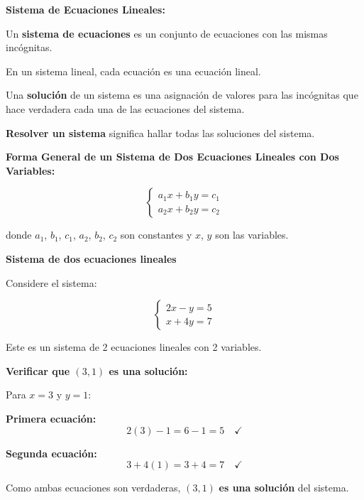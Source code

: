 


\begin{definition}
\textbf{Sistema de Ecuaciones Lineales:}

Un \textbf{sistema de ecuaciones} es un conjunto de ecuaciones con las mismas incógnitas.

En un sistema lineal, cada ecuación es una ecuación lineal.

Una \textbf{solución} de un sistema es una asignación de valores para las incógnitas que hace verdadera cada una de las ecuaciones del sistema.

\textbf{Resolver un sistema} significa hallar todas las soluciones del sistema.
\end{definition}

\textbf{Forma General de un Sistema de Dos Ecuaciones Lineales con Dos Variables:}

$$\begin{cases}
a_1x + b_1y = c_1 \\
a_2x + b_2y = c_2
\end{cases}$$

donde $a_1$, $b_1$, $c_1$, $a_2$, $b_2$, $c_2$ son constantes y $x$, $y$ son las variables.

\begin{example}
\textbf{Sistema de dos ecuaciones lineales}

Considere el sistema:

$$\begin{cases}
2x - y = 5 \\
x + 4y = 7
\end{cases}$$

Este es un sistema de 2 ecuaciones lineales con 2 variables.

\textbf{Verificar que $(3, 1)$ es una solución:}

Para $x = 3$ y $y = 1$:

\textbf{Primera ecuación:}
$$2(3) - 1 = 6 - 1 = 5 \quad \checkmark$$

\textbf{Segunda ecuación:}
$$3 + 4(1) = 3 + 4 = 7 \quad \checkmark$$

Como ambas ecuaciones son verdaderas, $(3, 1)$ \textbf{es una solución} del sistema.
\end{example}

